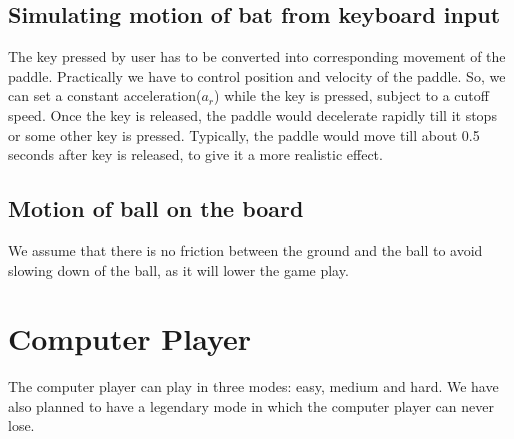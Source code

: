 \documentclass{article}
\begin{document}
\subsection{Simulating motion of bat from keyboard input}

The key pressed by user has to be converted into corresponding movement of the paddle. Practically we have to control position and velocity of the paddle. So, we can set a constant acceleration($a_r$) while the key is pressed, subject to a cutoff speed. Once the key is released, the paddle would decelerate rapidly till it stops or some other key is pressed. Typically, the paddle would move till about 0.5 seconds after key is released, to give it a more realistic effect.

\subsection{Motion of ball on the board}
We assume that there is no friction between the ground and the ball to avoid slowing down of the ball, as it will lower the game play.

\section{Computer Player}
The computer player can play in three modes: easy, medium and hard. We have also planned to have a legendary mode in which the computer player can never lose. 
\end{document}
